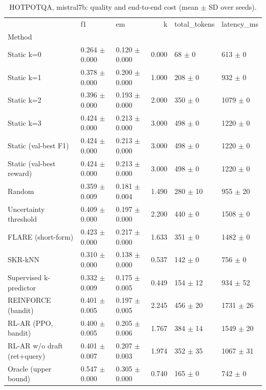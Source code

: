 \begin{table}
\caption{HOTPOTQA, mistral7b: quality and end-to-end cost (mean $\pm$ SD over seeds).}
\begin{tabular}{lllrll}
\toprule
 & f1 & em & k & total_tokens & latency_ms \\
Method &  &  &  &  &  \\
\midrule
Static k=0 & 0.264 $\pm$ 0.000 & 0.120 $\pm$ 0.000 & 0.000 & 68 $\pm$ 0 & 613 $\pm$ 0 \\
Static k=1 & 0.378 $\pm$ 0.000 & 0.200 $\pm$ 0.000 & 1.000 & 208 $\pm$ 0 & 932 $\pm$ 0 \\
Static k=2 & 0.396 $\pm$ 0.000 & 0.193 $\pm$ 0.000 & 2.000 & 350 $\pm$ 0 & 1079 $\pm$ 0 \\
Static k=3 & 0.424 $\pm$ 0.000 & 0.213 $\pm$ 0.000 & 3.000 & 498 $\pm$ 0 & 1220 $\pm$ 0 \\
Static (val-best F1) & 0.424 $\pm$ 0.000 & 0.213 $\pm$ 0.000 & 3.000 & 498 $\pm$ 0 & 1220 $\pm$ 0 \\
Static (val-best reward) & 0.424 $\pm$ 0.000 & 0.213 $\pm$ 0.000 & 3.000 & 498 $\pm$ 0 & 1220 $\pm$ 0 \\
Random & 0.359 $\pm$ 0.009 & 0.181 $\pm$ 0.004 & 1.490 & 280 $\pm$ 10 & 955 $\pm$ 20 \\
Uncertainty threshold & 0.409 $\pm$ 0.000 & 0.197 $\pm$ 0.000 & 2.200 & 440 $\pm$ 0 & 1508 $\pm$ 0 \\
FLARE (short-form) & 0.423 $\pm$ 0.000 & 0.217 $\pm$ 0.000 & 1.633 & 351 $\pm$ 0 & 1482 $\pm$ 0 \\
SKR-kNN & 0.310 $\pm$ 0.000 & 0.138 $\pm$ 0.000 & 0.537 & 142 $\pm$ 0 & 756 $\pm$ 0 \\
Supervised k-predictor & 0.332 $\pm$ 0.009 & 0.175 $\pm$ 0.005 & 0.449 & 154 $\pm$ 12 & 934 $\pm$ 52 \\
REINFORCE (bandit) & 0.401 $\pm$ 0.005 & 0.197 $\pm$ 0.005 & 2.245 & 456 $\pm$ 20 & 1731 $\pm$ 26 \\
RL-AR (PPO, bandit) & 0.400 $\pm$ 0.005 & 0.205 $\pm$ 0.006 & 1.767 & 384 $\pm$ 14 & 1549 $\pm$ 20 \\
RL-AR w/o draft (ret+query) & 0.401 $\pm$ 0.007 & 0.207 $\pm$ 0.003 & 1.974 & 352 $\pm$ 35 & 1067 $\pm$ 31 \\
Oracle (upper bound) & 0.547 $\pm$ 0.000 & 0.305 $\pm$ 0.000 & 0.740 & 165 $\pm$ 0 & 742 $\pm$ 0 \\
\bottomrule
\end{tabular}
\end{table}
